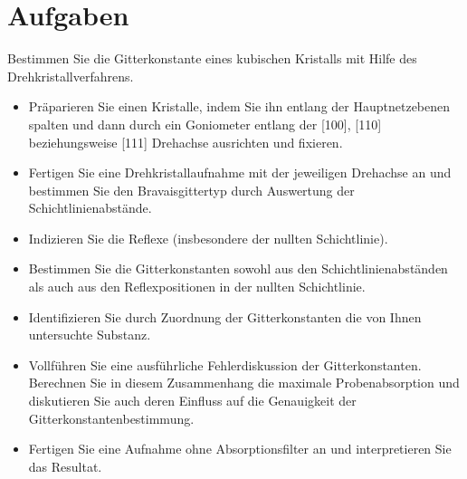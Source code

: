 \section{Aufgaben} %
\label{sec:aufgaben}
	
	Bestimmen Sie die Gitterkonstante eines kubischen Kristalls mit Hilfe des Drehkristallverfahrens.

	\begin{itemize}
		\item Präparieren Sie einen Kristalle, indem Sie ihn entlang der Hauptnetzebenen spalten und dann durch ein Goniometer entlang der [100], [110] beziehungsweise [111] Drehachse ausrichten und fixieren.
		\item Fertigen Sie  eine Drehkristallaufnahme mit der jeweiligen Drehachse an und bestimmen Sie den Bravaisgittertyp durch Auswertung der Schichtlinienabstände.
		\item Indizieren Sie die Reflexe (insbesondere der nullten Schichtlinie). 
		\item Bestimmen Sie die Gitterkonstanten sowohl aus den Schichtlinienabständen als auch aus den Reflexpositionen in der nullten Schichtlinie.
		\item Identifizieren Sie durch Zuordnung der Gitterkonstanten die von Ihnen untersuchte Substanz.
		\item Vollführen Sie eine ausführliche Fehlerdiskussion der Gitterkonstanten. Berechnen Sie in diesem Zusammenhang die maximale Probenabsorption und diskutieren Sie auch deren Einfluss auf die Genauigkeit der Gitterkonstantenbestimmung.
		\item Fertigen Sie eine Aufnahme ohne Absorptionsfilter an und interpretieren Sie das Resultat.
	\end{itemize}

